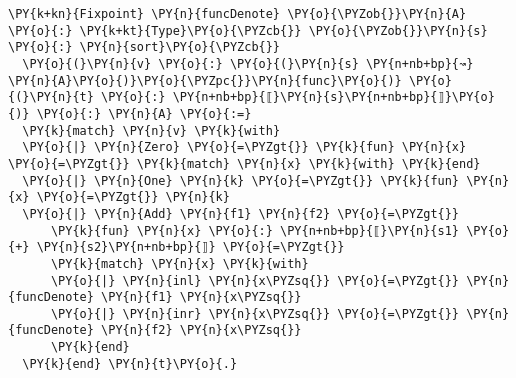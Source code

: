 {\small
\begin{Verbatim}[commandchars=\\\{\}]
\PY{k+kn}{Fixpoint} \PY{n}{funcDenote} \PY{o}{\PYZob{}}\PY{n}{A} \PY{o}{:} \PY{k+kt}{Type}\PY{o}{\PYZcb{}} \PY{o}{\PYZob{}}\PY{n}{s} \PY{o}{:} \PY{n}{sort}\PY{o}{\PYZcb{}}
  \PY{o}{(}\PY{n}{v} \PY{o}{:} \PY{o}{(}\PY{n}{s} \PY{n+nb+bp}{↝} \PY{n}{A}\PY{o}{)}\PY{o}{\PYZpc{}}\PY{n}{func}\PY{o}{)} \PY{o}{(}\PY{n}{t} \PY{o}{:} \PY{n+nb+bp}{⟦}\PY{n}{s}\PY{n+nb+bp}{⟧}\PY{o}{)} \PY{o}{:} \PY{n}{A} \PY{o}{:=}
  \PY{k}{match} \PY{n}{v} \PY{k}{with}
  \PY{o}{|} \PY{n}{Zero} \PY{o}{=\PYZgt{}} \PY{k}{fun} \PY{n}{x} \PY{o}{=\PYZgt{}} \PY{k}{match} \PY{n}{x} \PY{k}{with} \PY{k}{end}
  \PY{o}{|} \PY{n}{One} \PY{n}{k} \PY{o}{=\PYZgt{}} \PY{k}{fun} \PY{n}{x} \PY{o}{=\PYZgt{}} \PY{n}{k}
  \PY{o}{|} \PY{n}{Add} \PY{n}{f1} \PY{n}{f2} \PY{o}{=\PYZgt{}}
      \PY{k}{fun} \PY{n}{x} \PY{o}{:} \PY{n+nb+bp}{⟦}\PY{n}{s1} \PY{o}{+} \PY{n}{s2}\PY{n+nb+bp}{⟧} \PY{o}{=\PYZgt{}}
      \PY{k}{match} \PY{n}{x} \PY{k}{with}
      \PY{o}{|} \PY{n}{inl} \PY{n}{x\PYZsq{}} \PY{o}{=\PYZgt{}} \PY{n}{funcDenote} \PY{n}{f1} \PY{n}{x\PYZsq{}}
      \PY{o}{|} \PY{n}{inr} \PY{n}{x\PYZsq{}} \PY{o}{=\PYZgt{}} \PY{n}{funcDenote} \PY{n}{f2} \PY{n}{x\PYZsq{}}
      \PY{k}{end}
  \PY{k}{end} \PY{n}{t}\PY{o}{.}
\end{Verbatim}
}
